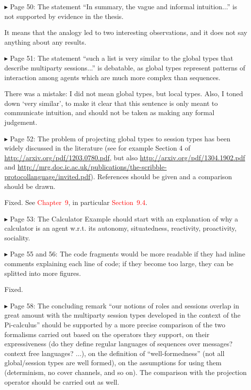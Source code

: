\documentclass{article}
\newcommand*\R[1]{\textcolor{red}{#1}} %
\newcommand{\todo}[1]{[\textcolor{green}{TODO}: #1]}
\newenvironment{them}%
  {\bigskip\noindent\begingroup\color{blue}$\blacktriangleright$\enspace}%
  {\endgroup\par}
\begin{document}
\begin{them}
Page 50:
The statement ``In summary, the vague and informal intuition...'' is not
supported by evidence in the thesis.
\end{them}
It means that the analogy led to two interesting observations, and it does not
say anything about any results.

\begin{them}
Page 51:
The statement ``such a list is very similar to the global types that describe
multiparty sessions...'' is debatable, as global types represent patterns of
interaction among agents which are much more complex than sequences.
\end{them}

There was a mistake: I did not mean global types, but local types.
Also, I toned down `very similar',
  to make it clear that this sentence is only meant to communicate intuition,
and should not be taken as making any formal judgement.


\begin{them}
Page 52:
The problem of projecting global types to session types has been widely
discussed in the literature (see for example Section 4 of
\url{http://arxiv.org/pdf/1203.0780.pdf}, but also
\url{http://arxiv.org/pdf/1304.1902.pdf} and
\url{http://mrg.doc.ic.ac.uk/publications/the-scribble-protocollanguage/invited.pdf}).
References should be given and a comparison should be drawn.
\end{them}

Fixed.
See \R{Chapter~9},
  in particular \R{Section~9.4}.

\begin{them}
Page 53:
The Calculator Example should start with an explanation of why a calculator is
an agent w.r.t. its autonomy, situatedness, reactivity, proactivity, sociality.
\end{them}
\todo{}

\begin{them}
Page 55 and 56:
The code fragments would be more readable if they had inline comments
explaining each line of code; if they become too large, they can be splitted
into more figures.
\end{them}
Fixed.

\begin{them}
Page 58:
The concluding remark ``our notions of roles and sessions overlap in great
amount with the multiparty session types developed in the context of the
Pi-calculus'' should be supported by a more precise comparison of the two
formalisms carried out based on the operators they support, on their
expressiveness (do they define regular languages of sequences over messages?
context free languages? ...), on the definition of ``well-formedness'' (not all
global/session types are well formed), on the assumptions for using them
(determinism, no cover channels, and so on). The comparison with the projection
operator should be carried out as well.
\end{them}
\end{document}
